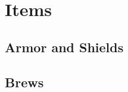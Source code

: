 

\section{Items} \label{sec::items}
\subsection*{Armor and Shields} \label{ssec::armor}
\subsection*{Brews} \label{ssec::brews}
